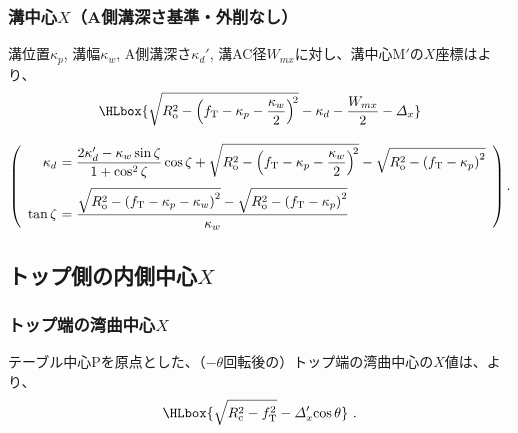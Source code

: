\subsubsection{溝中心\texorpdfstring{$X$}{X}（A側溝深さ基準・外削なし）}
溝位置$\kappa_p$, 溝幅$\kappa_w$, A側溝深さ$\kappa_d'$, 溝AC径$W_{mx}$に対し、溝中心M$'$の$X$座標はより、
\begin{gather*}
  \HLbox{%
    \sqrt{R_\mathrm o^2-\left(f_\mathrm T-\kappa_p-\frac{\kappa_w}2\right)^{\!2}}
    -\kappa_d
    -\frac{W_{mx}}2
    -\varDelta_x%
  }\\[9pt]
  \left(
  \begin{array}{rl}
  \kappa_d\!\!\!\!
  &= \displaystyle
     \frac{2\kappa_d'-\kappa_w\sin\zeta}{1+\cos^2\zeta}\cos\zeta
     +\sqrt{R_\mathrm o^2-\left(f_\mathrm T-\kappa_p-\frac{\kappa_w}2\right)^{\!2}}
     -\sqrt{R_\mathrm o^2-\left(f_\mathrm T-\kappa_p\right)^2}\\[12pt]
  \tan\zeta\!\!\!\!
  &= \displaystyle
     \frac{\sqrt{R_\mathrm o^2-\left(f_\mathrm T-\kappa_p-\kappa_w\right)^2}
           -\sqrt{R_\mathrm o^2-\left(f_\mathrm T-\kappa_p\right)^2}}
          {\kappa_w}
  \end{array}
  \right).
\end{gather*}


\clearpage
\subsection{トップ側の内側中心\texorpdfstring{$X$}{X}}

\subsubsection{トップ端の湾曲中心\texorpdfstring{$X$}{X}}
テーブル中心Pを原点とした、（$-\theta$回転後の）トップ端の湾曲中心の$X$値は、より、
\begin{align*}
  \HLbox{\sqrt{R_\mathrm c^2-f_\mathrm T^2}-\varDelta_x'\!\cos\theta}~.
\end{align*}

